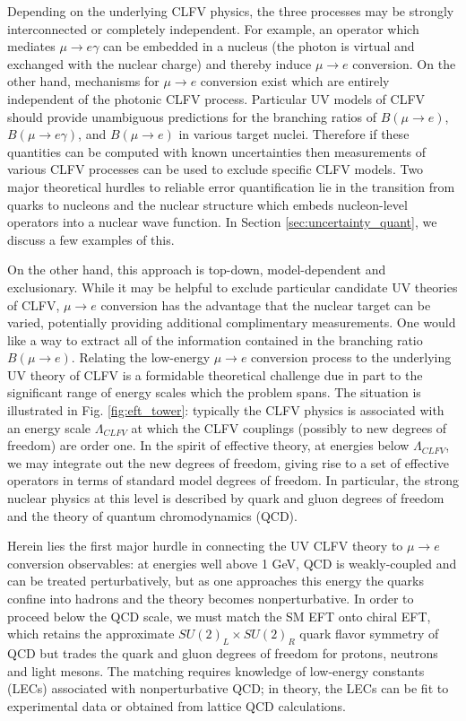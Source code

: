 \documentclass{book}[12pt]
\begin{document}
Depending on the underlying CLFV physics, the three processes may be strongly interconnected or completely independent. For example, an operator which mediates $\mu\rightarrow e\gamma$ can be embedded in a nucleus (the photon is virtual and exchanged with the nuclear charge) and thereby induce $\mu\rightarrow e$ conversion. On the other hand, mechanisms for $\mu\rightarrow e$ conversion exist which are entirely independent of the photonic CLFV process. Particular UV models of CLFV should provide unambiguous predictions for the branching ratios of $B(\mu\rightarrow e)$, $B(\mu\rightarrow e\gamma)$, and $B(\mu\rightarrow e)$ in various target nuclei. Therefore if these quantities can be computed with known uncertainties then measurements of various CLFV processes can be used to exclude specific CLFV models. Two major theoretical hurdles to reliable error quantification lie in the transition from quarks to nucleons and the nuclear structure which embeds nucleon-level operators into a nuclear wave function. In Section \ref{sec:uncertainty_quant}, we discuss a few examples of this. 

On the other hand, this approach is top-down, model-dependent and exclusionary. While it may be helpful to exclude particular candidate UV theories of CLFV,  $\mu\rightarrow e$ conversion has the advantage that the nuclear target can be varied, potentially providing additional complimentary measurements. One would like a way to extract all of the information contained in the branching ratio $B(\mu\rightarrow e)$. Relating the low-energy $\mu\rightarrow e$ conversion process to the underlying UV theory of CLFV is a formidable theoretical challenge due in part to the significant range of energy scales which the problem spans. The situation is illustrated in Fig. \ref{fig:eft_tower}: typically the CLFV physics is associated with an energy scale $\Lambda_{CLFV}$ at which the CLFV couplings (possibly to new degrees of freedom) are order one. In the spirit of effective theory, at energies below $\Lambda_{CLFV}$, we may integrate out the new degrees of freedom, giving rise to a set of effective operators in terms of standard model degrees of freedom. In particular, the strong nuclear physics at this level is described by quark and gluon degrees of freedom and the theory of quantum chromodynamics (QCD). 

Herein lies the first major hurdle in connecting the UV CLFV theory to $\mu\rightarrow e$ conversion observables: at energies well above 1 GeV, QCD is weakly-coupled and can be treated perturbatively, but as one approaches this energy the quarks confine into hadrons and the theory becomes nonperturbative. In order to proceed below the QCD scale, we must match the SM EFT onto chiral EFT, which retains the approximate $SU(2)_L\times SU(2)_R$ quark flavor symmetry of QCD but trades the quark and gluon degrees of freedom for protons, neutrons and light mesons. The matching requires knowledge of low-energy constants (LECs) associated with nonperturbative QCD; in theory, the LECs can be fit to experimental data or obtained from lattice QCD calculations. 
\end{document}
